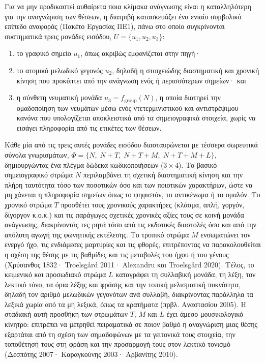 \documentclass[11pt,a4paper]{article}
\begin{document}
Για να μην προδικαστεί αυθαίρετα ποια κλίμακα ανάγνωσης είναι η καταλληλότερη για την αναγνώριση των θέσεων, η διατριβή κατασκευάζει ένα ενιαίο συμβολικό επίπεδο αναφοράς (Πακέτο Εργασίας ΠΕ1), πάνω στο οποίο συγκρίνονται συστηματικά τρεις μονάδες εισόδου, $U=\{u_1,u_2,u_3\}$:
\begin{enumerate}
\item το γραφικό σημείο $u_1$, όπως ακριβώς εμφανίζεται στην πηγή·
\item το ατομικό μελωδικό γεγονός $u_2$, δηλαδή η στοιχειώδης διαστηματική και χρονική κίνηση που προκύπτει από την ανάγνωση ενός ή περισσότερων σημείων· και
\item η σύνθετη νευματική μονάδα $u_3=f_{\text{group}}(N)$, η οποία διατηρεί την ομαδοποίηση των νευμάτων μέσω ενός ντετερμινιστικού και αντιστρέψιμου κανόνα που υπολογίζεται αποκλειστικά από τα σημειογραφικά στοιχεία, χωρίς να εισάγει πληροφορία από τις ετικέτες των θέσεων.
\end{enumerate}

Κάθε μία από τις τρεις αυτές μονάδες εισόδου διασταυρώνεται με τέσσερα σωρευτικά σύνολα γνωρισμάτων, $\Phi=\{N,\;N{+}T,\;N{+}T{+}M,\;N{+}T{+}M{+}L\}$, δημιουργώντας ένα πλέγμα δώδεκα κωδικοποιήσεων ($3\times4$). Το βασικό σημειογραφικό στρώμα $N$ περιλαμβάνει τη σχετική διαστηματική κίνηση και την πλήρη ταυτότητα τόσο των ποσοτικών όσο και των ποιοτικών χαρακτήρων, ώστε να μη χάνεται η πληροφορία σημείων όπως το ψηφιστόν, το αντικένωμα ή το ομαλόν. Το χρονικό στρώμα $T$ προσθέτει τους χρονικούς χαρακτήρες (κλάσμα, απλή, γοργόν, δίγοργον κ.ο.κ.) και τις παράγωγες σχετικές χρονικές αξίες τους σε κοινή μονάδα ανάγνωσης, διακρίνοντάς τες ρητά τόσο από τις εκδοτικές διαστολές όσο και από την απόλυτη αγωγή της φωνητικής εκτέλεσης. Το τροπικό στρώμα $M$ ενσωματώνει τον ενεργό ήχο, τις ενδιάμεσες μαρτυρίες και τις φθορές, επιτρέποντας να παρακολουθείται η σχέση της θέσης με τις βαθμίδες και τις μεταβολές του ήχου ή του γένους (Χρύσανθος 1832· Troelsgård 2011· Alexandru και Troelsgård 2020). Τέλος, το κειμενικό και προσωδιακό στρώμα $L$ καταγράφει τη συλλαβική μονάδα, τη λέξη, τον λεκτικό τόνο, τα όρια λέξης και φράσης και την τοπική μελισματική πυκνότητα, δηλαδή τον αριθμό μελωδικών γεγονότων ανά συλλαβή, διακρίνοντας παράλληλα τα λεξικά χωρία από τα μη λεξικά, όπως τα κρατήματα (πρβλ. Αναστασίου 2005). Η σταδιακή αυτή προσθήκη των στρωμάτων $T$, $M$ και $L$ έχει άμεσο μουσικολογικό κίνητρο: επιτρέπει να μετρηθεί πειραματικά σε ποιον βαθμό η αναγνώριση μιας θέσης εξαρτάται από τη σχέση των σημαδοφώνων με τα γειτονικά τους στοιχεία, την τοποθέτησή τους στη φράση και την προσαρμογή τους στον λεκτικό τονισμό (Δεσπότης 2007· Καραγκούνης 2003· Αρβανίτης 2010).
\end{document}
